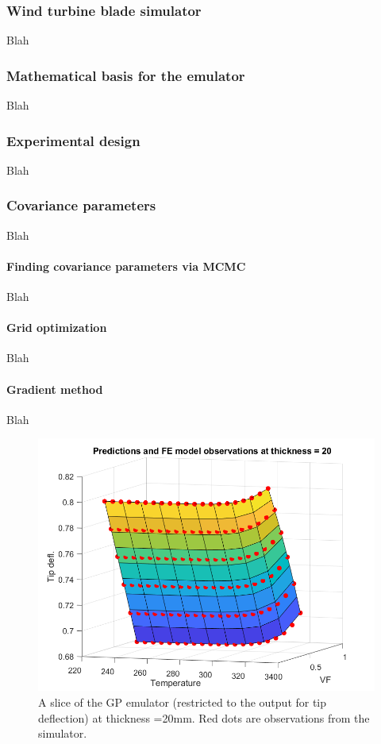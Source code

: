 \documentclass{article}
\begin{document}
\subsubsection{Wind turbine blade simulator}
Blah

\subsubsection{Mathematical basis for the emulator}
Blah

\subsubsection{Experimental design}
Blah

\subsubsection{Covariance parameters}
Blah

\paragraph{Finding covariance parameters via MCMC}
Blah

\paragraph{Grid optimization}
Blah

\paragraph{Gradient method}
Blah

\begin{figure}
\centering
\includegraphics[width=.65\linewidth]{emulator_surface}
\caption{A slice of the GP emulator (restricted to the output for tip deflection) at thickness =20mm. Red dots are observations from the simulator.}
\label{fig:emulator_surface}
\end{figure}
\end{document}
